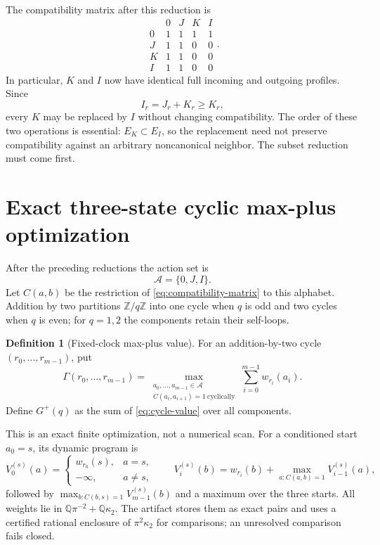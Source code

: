 \documentclass[11pt]{article}
\theoremstyle{definition}
\newtheorem{definition}[theorem]{Definition}
\theoremstyle{remark}
\newcommand{\kap}{\kappa_2}
\newcommand{\Z}{\mathbb Z}
\begin{document}
The compatibility matrix after this reduction is
\begin{equation}
\begin{array}{c|cccc}
 &0&J&K&I\\ \hline
0&1&1&1&1\\
J&1&1&0&0\\
K&1&1&0&0\\
I&1&1&0&0
\end{array}.
\label{eq:compatibility-matrix}
\end{equation}
In particular, $K$ and $I$ now have identical full incoming and outgoing
profiles.  Since
\[
                          I_r=J_r+K_r\ge K_r,
\]
every $K$ may be replaced by $I$ without changing compatibility.  The order
of these two operations is essential: $E_K\subset E_I$, so the replacement
need not preserve compatibility against an arbitrary noncanonical neighbor.
The subset reduction must come first.

\section{Exact three-state cyclic max-plus optimization}

After the preceding reductions the action set is
\[
                         \mathcal A=\{0,J,I\}.
\]
Let $C(a,b)$ be the restriction of \eqref{eq:compatibility-matrix} to this
alphabet.  Addition by two partitions $\Z/q\Z$ into one cycle when $q$ is
odd and two cycles when $q$ is even; for $q=1,2$ the components retain their
self-loops.

\begin{definition}[Fixed-clock max-plus value]
For an addition-by-two cycle $(r_0,\ldots,r_{m-1})$, put
\begin{equation}
 \Gamma(r_0,\ldots,r_{m-1})=
 \max_{\substack{a_0,\ldots,a_{m-1}\in\mathcal A\\
 C(a_i,a_{i+1})=1\ \mathrm{cyclically}}}
 \sum_{i=0}^{m-1}w_{r_i}(a_i).
 \label{eq:cycle-value}
\end{equation}
Define $G^+(q)$ as the sum of \eqref{eq:cycle-value} over all components.
\end{definition}

This is an exact finite optimization, not a numerical scan.  For a
conditioned start $a_0=s$, its dynamic program is
\begin{equation}
 V_0^{(s)}(a)=
 \begin{cases}w_{r_0}(s),&a=s,\\-\infty,&a\ne s,\end{cases}
 \qquad
 V_i^{(s)}(b)=w_{r_i}(b)+\max_{a:C(a,b)=1}V_{i-1}^{(s)}(a),
 \label{eq:max-plus-dp}
\end{equation}
followed by $\max_{b:C(b,s)=1}V_{m-1}^{(s)}(b)$ and a maximum over the three
starts.  All weights lie in
$\mathbb Q\pi^{-2}+\mathbb Q\kap$.  The artifact stores them as exact pairs
and uses a certified rational enclosure of $\pi^2\kap$ for comparisons; an
unresolved comparison fails closed.
\end{document}
